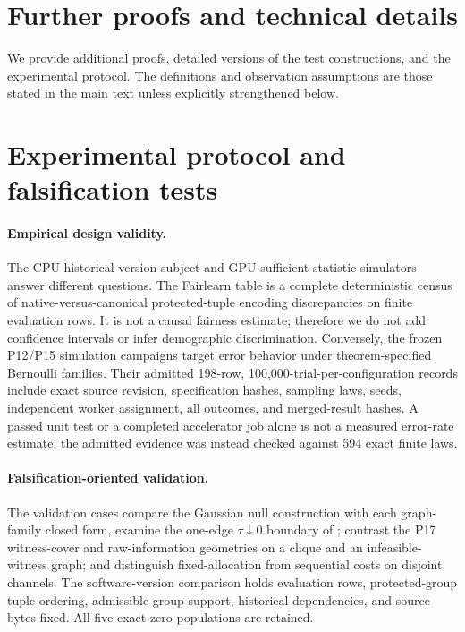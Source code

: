 \clearpage
\onecolumn
\appendix
\section{Further proofs and technical details}
We provide additional proofs, detailed versions of the test constructions, and the experimental protocol. The definitions and observation assumptions are those stated in the main text unless explicitly strengthened below.











\section{Experimental protocol and falsification tests}
\paragraph{Empirical design validity.}
The CPU historical-version subject and GPU sufficient-statistic simulators answer different questions. The Fairlearn table is a complete deterministic census of native-versus-canonical protected-tuple encoding discrepancies on finite evaluation rows. It is not a causal fairness estimate; therefore we do not add confidence intervals or infer demographic discrimination. Conversely, the frozen P12/P15 simulation campaigns target error behavior under theorem-specified Bernoulli families. Their admitted 198-row, 100,000-trial-per-configuration records include exact source revision, specification hashes, sampling laws, seeds, independent worker assignment, all outcomes, and merged-result hashes. A passed unit test or a completed accelerator job alone is not a measured error-rate estimate; the admitted evidence was instead checked against 594 exact finite laws.

\paragraph{Falsification-oriented validation.}
The validation cases compare the Gaussian null construction with each graph-family closed form, examine the one-edge $\tau\downarrow0$ boundary of ; contrast the P17 witness-cover and raw-information geometries on a clique and an infeasible-witness graph; and distinguish fixed-allocation from sequential costs on disjoint channels. The software-version comparison holds evaluation rows, protected-group tuple ordering, admissible group support, historical dependencies, and source bytes fixed. All five exact-zero populations are retained.

